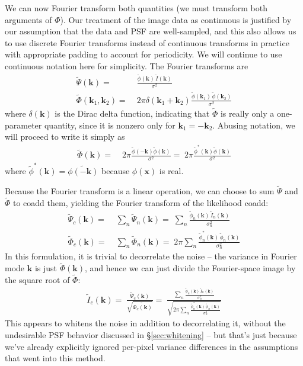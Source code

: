 \documentclass[10pt]{article}
\newcommand{\secref}[1]{\S\ref{sec:#1}}
\begin{document}
We can now Fourier transform both quantities (we must transform both arguments of $\Phi$).  Our treatment of the image data as continuous is justified by our assumption that the data and PSF are well-sampled, and this also allows us to use discrete Fourier transforms instead of continuous transforms in practice with appropriate padding to account for periodicity.  We will continue to use continuous notation here for simplicity.  The Fourier transforms are
\begin{align}
\tilde{\Psi}(\bm{k}) =\;&
    \frac{\tilde{\phi}(\bm{k}) \, \tilde{I}(\bm{k})}{\sigma^2} \\
\tilde{\Phi}(\bm{k}_1,\bm{k}_2) =\;&
    2\pi\delta(\bm{k}_1+\bm{k}_2)
    \frac{\tilde{\phi}(\bm{k}_1) \, \tilde{\phi}(\bm{k}_2)}{\sigma^2}
\end{align}
where $\delta(\bm{k})$ is the Dirac delta function, indicating that $\tilde{\Phi}$ is really only a one-parameter quantity, since it is nonzero only for $\bm{k}_1 = -\bm{k}_2$.  Abusing notation, we will proceed to write it simply as
\begin{align}
\tilde{\Phi}(\bm{k}) =\;&
    2\pi \frac{\tilde{\phi}(-\bm{k}) \tilde{\phi}(\bm{k})}{\sigma^2}
    =\; 2\pi \frac{\tilde{\phi}^*(\bm{k}) \tilde{\phi}(\bm{k})}{\sigma^2}
\end{align}
where $\tilde{\phi}^*(\bm{k})=\tilde{\phi(-\bm{k})}$ because $\phi(\bm{x})$ is real.

Because the Fourier transform is a linear operation, we can choose to sum $\tilde{\Psi}$ and $\tilde{\Phi}$ to coadd them, yielding the Fourier transform of the likelihood coadd:
\begin{align}
\tilde{\Psi}_c(\bm{k}) =\;& \sum_n \tilde{\Psi}_n(\bm{k})
    =\; \sum_n \frac{\tilde{\phi}_n(\bm{k}) \, \tilde{I}_n(\bm{k})}
                    {\sigma_n^2} \\
\tilde{\Phi}_c(\bm{k}) =\;&
    \sum_n \tilde{\Phi}_n(\bm{k})
    =\; 2\pi \sum_n
    \frac{\tilde{\phi}^*_n(\bm{k}) \, \tilde{\phi}_n(\bm{k})}{\sigma_n^2}
\end{align}
In this formulation, it is trivial to decorrelate the noise -- the variance in Fourier mode $\bm{k}$ is just $\tilde{\Phi}(\bm{k})$, and hence we can just divide the Fourier-space image by the square root of $\tilde{\Phi}$:
\begin{align}
    \tilde{I}_c(\bm{k}) =\;
        \frac{\tilde{\Psi}_c(\bm{k})}{\sqrt{\tilde{\Phi_c(\bm{k})}}}
    =\;
        \frac{
            \sum\limits_n \frac{
                \tilde{\phi}_n(\bm{k}) \, \tilde{I}_n(\bm{k})
            }{
                \sigma_n^2
            }
        }{
            \sqrt{
                2\pi \sum\limits_n
                \frac{
                    \tilde{\phi}^*_n(\bm{k}) \, \tilde{\phi}_n(\bm{k})
                }{
                    \sigma_n^2
                }
            }
        }
\end{align}
This appears to whitens the noise in addition to decorrelating it, without the undesirable PSF behavior discussed in \secref{whitening} -- but that's just because we've already explicitly ignored per-pixel variance differences in the assumptions that went into this method.
\end{document}
